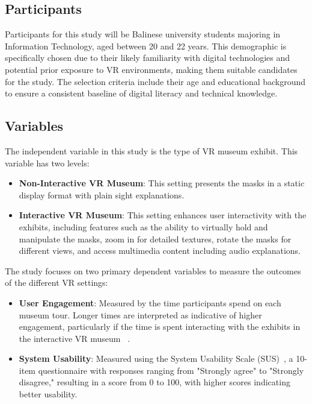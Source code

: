 \documentclass[conference]{IEEEtran}
\begin{document}
\subsection{Participants}
Participants for this study will be Balinese university students majoring in Information Technology, aged between 20 and 22 years. This demographic is specifically chosen due to their likely familiarity with digital technologies and potential prior exposure to VR environments, making them suitable candidates for the study. The selection criteria include their age and educational background to ensure a consistent baseline of digital literacy and technical knowledge.

\subsection{Variables}
The independent variable in this study is the type of VR museum exhibit. This variable has two levels:

\begin{itemize}
    \item \textbf{Non-Interactive VR Museum}: This setting presents the masks in a static display format with plain sight explanations.
    \item \textbf{Interactive VR Museum}: This setting enhances user interactivity with the exhibits, including features such as the ability to virtually hold and manipulate the masks, zoom in for detailed textures, rotate the masks for different views, and access multimedia content including audio explanations.
\end{itemize}

The study focuses on two primary dependent variables to measure the outcomes of the different VR settings:

\begin{itemize}
    \item \textbf{User Engagement}: Measured by the time participants spend on each museum tour. Longer times are interpreted as indicative of higher engagement, particularly if the time is spent interacting with the exhibits in the interactive VR museum ~\cite{read2021engagement}.
    \item \textbf{System Usability}: Measured using the System Usability Scale (SUS)~\cite{vlachogianni2022perceived}, a 10-item questionnaire with responses ranging from "Strongly agree" to "Strongly disagree," resulting in a score from 0 to 100, with higher scores indicating better usability.
\end{itemize}
\end{document}
